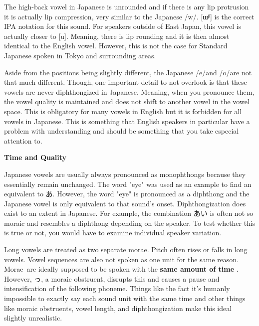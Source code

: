\par{The high-back vowel in Japanese is unrounded and if there is any lip protrusion it is actually lip compression, very similar to the Japanese \slash w\slash . [ɯᵝ] is the correct IPA notation for this sound. For speakers outside of East Japan, this vowel is actually closer to [u]. Meaning, there is lip rounding and it is then almost identical to the English vowel. However, this is not the case for Standard Japanese spoken in Tokyo and surrounding areas. }

\par{Aside from the positions being slightly different, the Japanese \slash e\slash  and \slash o\slash  are not that much different. Though, one important detail to not overlook is that these vowels are never diphthongized in Japanese. Meaning, when you pronounce them, the vowel quality is maintained and does not shift to another vowel in the vowel space. This is obligatory for many vowels in English but it is forbidden for all vowels in Japanese. This is something that English speakers in particular have a problem with understanding and should be something that you take especial attention to. }

\par{ \textbf{Time and Quality }}

\par{Japanese vowels are usually always pronounced as monophthongs because they essentially remain unchanged. The word "eye" was used as an example to find an equivalent to あ. However, the word "eye" is pronounced as a diphthong and the Japanese vowel is only equivalent to that sound's onset. Diphthongization does exist to an extent in Japanese. For example, the combination あい is often not so moraic and resembles a diphthong depending on the speaker. To test whether this is true or not, you would have to examine individual speaker variation. }
 
\par{Long vowels are treated as two separate morae. Pitch often rises or falls in long vowels. Vowel sequences are also not spoken as one unit for the same reason. Morae are ideally supposed to be spoken with the \textbf{same amount of time }. However, っ, a moraic obstruent, disrupts this and causes a pause and intensification of the following phoneme. Things like the fact it's humanly impossible to exactly say each sound unit with the same time and other things like moraic obstruents, vowel length, and diphthongization make this ideal slightly unrealistic. }
 
